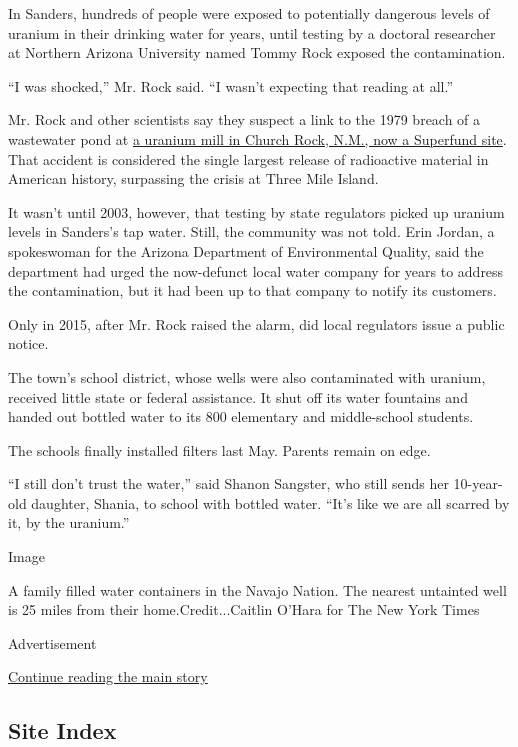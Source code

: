 In Sanders, hundreds of people were exposed to potentially dangerous
levels of uranium in their drinking water for years, until testing by a
doctoral researcher at Northern Arizona University named Tommy Rock
exposed the contamination.

``I was shocked,'' Mr. Rock said. ``I wasn't expecting that reading at
all.''

Mr. Rock and other scientists say they suspect a link to the 1979 breach
of a wastewater pond at
\href{https://cumulis.epa.gov/supercpad/cursites/csitinfo.cfm?id=0600819}{a
uranium mill in Church Rock, N.M., now a Superfund site}. That accident
is considered the single largest release of radioactive material in
American history, surpassing the crisis at Three Mile Island.

It wasn't until 2003, however, that testing by state regulators picked
up uranium levels in Sanders's tap water. Still, the community was not
told. Erin Jordan, a spokeswoman for the Arizona Department of
Environmental Quality, said the department had urged the now-defunct
local water company for years to address the contamination, but it had
been up to that company to notify its customers.

Only in 2015, after Mr. Rock raised the alarm, did local regulators
issue a public notice.

The town's school district, whose wells were also contaminated with
uranium, received little state or federal assistance. It shut off its
water fountains and handed out bottled water to its 800 elementary and
middle-school students.

The schools finally installed filters last May. Parents remain on edge.

``I still don't trust the water,'' said Shanon Sangster, who still sends
her 10-year-old daughter, Shania, to school with bottled water. ``It's
like we are all scarred by it, by the uranium.''

Image

A family filled water containers in the Navajo Nation. The nearest
untainted well is 25 miles from their home.Credit...Caitlin O'Hara for
The New York Times

Advertisement

\protect\hyperlink{after-bottom}{Continue reading the main story}

\hypertarget{site-index}{%
\subsection{Site Index}\label{site-index}}

